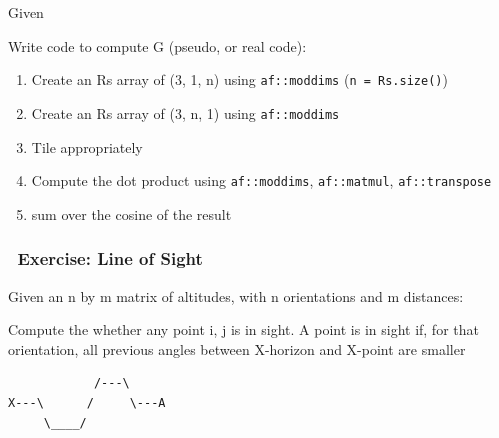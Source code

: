 Given

\begin{Shaded}
\begin{Highlighting}[]
\NormalTok{, }\NormalTok{>> } 
\NormalTok{, }\NormalTok{>> } 
\end{Highlighting}
\end{Shaded}

Write code to compute G (pseudo, or real code):

\begin{enumerate}
\def\labelenumi{\arabic{enumi}.}
\itemsep1pt\parskip0pt
\item
  Create an Rs array of (3, 1, n) using \texttt{af::moddims}
  (\texttt{n = Rs.size()})
\item
  Create an Rs array of (3, n, 1) using \texttt{af::moddims}
\item
  Tile appropriately
\item
  Compute the dot product using \texttt{af::moddims},
  \texttt{af::matmul}, \texttt{af::transpose}
\item
  sum over the cosine of the result
\end{enumerate}

\subsubsection{~Exercise: Line of Sight}\label{exercise-line-of-sight}

Given an n by m matrix of altitudes, with n orientations and m
distances:

\begin{Shaded}
\begin{Highlighting}[]
\end{Highlighting}
\end{Shaded}

Compute the whether any point i, j is in sight. A point is in sight if,
for that orientation, all previous angles between X-horizon and X-point
are smaller

\begin{verbatim}
            /---\
X---\      /     \---A
     \____/
\end{verbatim}

